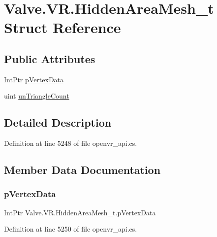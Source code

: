 \hypertarget{struct_valve_1_1_v_r_1_1_hidden_area_mesh__t}{}\section{Valve.\+V\+R.\+Hidden\+Area\+Mesh\+\_\+t Struct Reference}
\label{struct_valve_1_1_v_r_1_1_hidden_area_mesh__t}
\subsection*{Public Attributes}
\begin{DoxyCompactItemize}
\item 
Int\+Ptr \mbox{\hyperlink{struct_valve_1_1_v_r_1_1_hidden_area_mesh__t_ab00210559183dac88d34070a6c6e2106}{p\+Vertex\+Data}}
\item 
uint \mbox{\hyperlink{struct_valve_1_1_v_r_1_1_hidden_area_mesh__t_ac4ce0762f7111c2e6a3821992f5e968d}{un\+Triangle\+Count}}
\end{DoxyCompactItemize}


\subsection{Detailed Description}


Definition at line 5248 of file openvr\+\_\+api.\+cs.



\subsection{Member Data Documentation}
\mbox{\label{struct_valve_1_1_v_r_1_1_hidden_area_mesh__t_ab00210559183dac88d34070a6c6e2106}} 
\subsubsection{\texorpdfstring{pVertexData}{pVertexData}}
{\footnotesize\ttfamily Int\+Ptr Valve.\+V\+R.\+Hidden\+Area\+Mesh\+\_\+t.\+p\+Vertex\+Data}



Definition at line 5250 of file openvr\+\_\+api.\+cs.

\mbox{\label{struct_valve_1_1_v_r_1_1_hidden_area_mesh__t_ac4ce0762f7111c2e6a3821992f5e968d}} 
